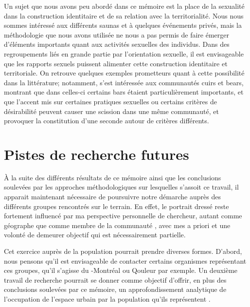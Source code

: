 Un sujet que nous avons peu abordé dans ce mémoire est la place de la sexualité dans la construction identitaire et de sa relation avec la territorialité.
Nous nous sommes intéressé aux différents saunas et à quelques événements privés, mais la méthodologie que nous avons utilisée ne nous a pas permis de faire émerger d'éléments importants quant aux activités sexuelles des individus.
Dans des regroupements liés en grande partie par l'orientation sexuelle, il est envisageable que les rapports sexuels puissent alimenter cette construction identitaire et territoriale.
On retrouve quelques exemples prometteurs quant à cette possibilité dans la littérature; notamment, \citet{Hennen2013} s'est intéressée aux communautés cuirs et bears, montrant que dans celles-ci certains bars étaient particulièrement importants, et que l'accent mis sur certaines pratiques sexuelles ou certains critères de désirabilité peuvent causer une scission dans une même communauté, et provoquer la constitution d'une seconde autour de critères différents.

\section*{Pistes de recherche futures}
\label{sec:pistes_de_recherches}

À la suite des différents résultats de ce mémoire ainsi que les conclusions soulevées par les approches méthodologiques sur lesquelles s'assoit ce travail, il apparait maintenant nécessaire de poursuivre notre démarche auprès des différents groupes rencontrés sur le terrain.
En effet, le portrait dressé reste fortement influencé par ma perspective personnelle de chercheur, autant comme géographe que comme membre de la communauté \lgbt{}, avec mes a priori et une volonté de demeurer objectif qui est nécessairement partielle.

Cet exercice auprès de la population pourrait prendre diverses formes.
D'abord, nous pensons qu'il est envisageable de contacter certains organismes représentant ces groupes, qu'il s'agisse du \gris{}-Montréal ou Qouleur par exemple.
Un deuxième travail de recherche pourrait se donner comme objectif d'offrir, en plus des conclusions soulevées par ce mémoire, un approfondissement analytique de l'occupation de l'espace urbain par la population qu'ils représentent .

